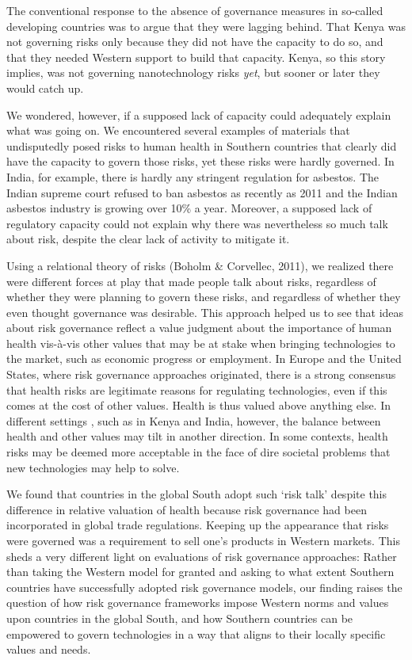 \documentclass[authordate, anecdote]{jote-new-article}
\begin{document}
	The conventional response to the absence of governance measures in so-called developing countries was to argue that they were lagging behind. That Kenya was not governing risks only because they did not have the capacity to do so, and that they needed Western support to build that capacity. Kenya, so this story implies, was not governing nanotechnology risks \emph{yet}, but sooner or later they would catch up.



	We wondered, however, if a supposed lack of capacity could adequately explain what was going on. We encountered several examples of materials that undisputedly posed risks to human health in Southern countries that clearly did have the capacity to govern those risks, yet these risks were hardly governed. In India, for example, there is hardly any stringent regulation for asbestos. The Indian supreme court refused to ban asbestos as recently as 2011 and the Indian asbestos industry is growing over 10\% a year. Moreover, a supposed lack of regulatory capacity could not explain why there was nevertheless so much talk about risk, despite the clear lack of activity to mitigate it.



	Using a relational theory of risks (Boholm \& Corvellec, 2011), we realized there were different forces at play that made people talk about risks, regardless of whether they were planning to govern these risks, and regardless of whether they even thought governance was desirable. This approach helped us to see that ideas about risk governance reflect a value judgment about the importance of human health vis-à-vis other values that may be at stake when bringing technologies to the market, such as economic progress or employment. In Europe and the United States, where risk governance approaches originated, there is a strong consensus that health risks are legitimate reasons for regulating technologies, even if this comes at the cost of other values. Health is thus valued above anything else. In different settings , such as in Kenya and India, however, the balance between health and other values may tilt in another direction. In some contexts, health risks may be deemed more acceptable in the face of dire societal problems that new technologies may help to solve.



	We found that countries in the global South adopt such ‘risk talk' despite this difference in relative valuation of health because risk governance had been incorporated in global trade regulations. Keeping up the appearance that risks were governed was a requirement to sell one's products in Western markets. This sheds a very different light on evaluations of risk governance approaches: Rather than taking the Western model for granted and asking to what extent Southern countries have successfully adopted risk governance models, our finding raises the question of how risk governance frameworks impose Western norms and values upon countries in the global South, and how Southern countries can be empowered to govern technologies in a way that aligns to their locally specific values and needs.
\end{document}
